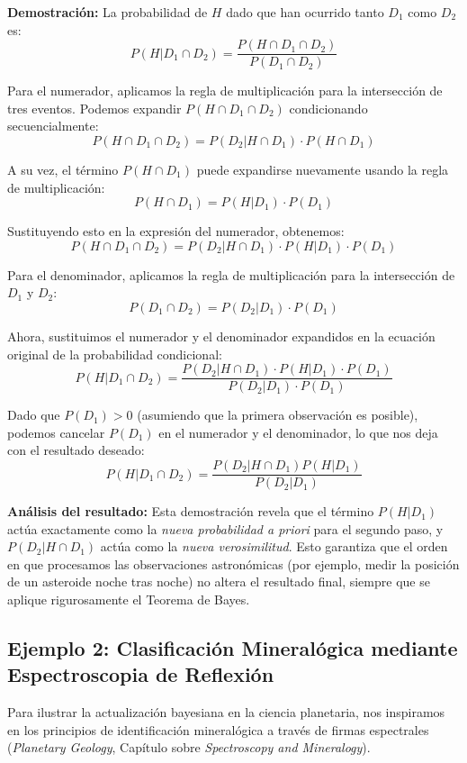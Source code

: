 \textbf{Demostración:}
La probabilidad de $H$ dado que han ocurrido tanto $D_1$ como $D_2$ es:
$$ P(H | D_1 \cap D_2) = \frac{P(H \cap D_1 \cap D_2)}{P(D_1 \cap D_2)} $$

Para el numerador, aplicamos la regla de multiplicación para la intersección de tres eventos. Podemos expandir $P(H \cap D_1 \cap D_2)$ condicionando secuencialmente:
$$ P(H \cap D_1 \cap D_2) = P(D_2 | H \cap D_1) \cdot P(H \cap D_1) $$

A su vez, el término $P(H \cap D_1)$ puede expandirse nuevamente usando la regla de multiplicación:
$$ P(H \cap D_1) = P(H | D_1) \cdot P(D_1) $$

Sustituyendo esto en la expresión del numerador, obtenemos:
$$ P(H \cap D_1 \cap D_2) = P(D_2 | H \cap D_1) \cdot P(H | D_1) \cdot P(D_1) $$

Para el denominador, aplicamos la regla de multiplicación para la intersección de $D_1$ y $D_2$:
$$ P(D_1 \cap D_2) = P(D_2 | D_1) \cdot P(D_1) $$

Ahora, sustituimos el numerador y el denominador expandidos en la ecuación original de la probabilidad condicional:
$$ P(H | D_1 \cap D_2) = \frac{P(D_2 | H \cap D_1) \cdot P(H | D_1) \cdot P(D_1)}{P(D_2 | D_1) \cdot P(D_1)} $$

Dado que $P(D_1) > 0$ (asumiendo que la primera observación es posible), podemos cancelar $P(D_1)$ en el numerador y el denominador, lo que nos deja con el resultado deseado:
$$ P(H | D_1 \cap D_2) = \frac{P(D_2 | H \cap D_1) P(H | D_1)}{P(D_2 | D_1)} $$

\textbf{Análisis del resultado:} Esta demostración revela que el término $P(H | D_1)$ actúa exactamente como la \textit{nueva probabilidad a priori} para el segundo paso, y $P(D_2 | H \cap D_1)$ actúa como la \textit{nueva verosimilitud}. Esto garantiza que el orden en que procesamos las observaciones astronómicas (por ejemplo, medir la posición de un asteroide noche tras noche) no altera el resultado final, siempre que se aplique rigurosamente el Teorema de Bayes.


\subsection{Ejemplo 2: Clasificación Mineralógica mediante Espectroscopia de Reflexión}

Para ilustrar la actualización bayesiana en la ciencia planetaria, nos inspiramos en los principios de identificación mineralógica a través de firmas espectrales (\textit{Planetary Geology}, Capítulo sobre \textit{Spectroscopy and Mineralogy}). 

